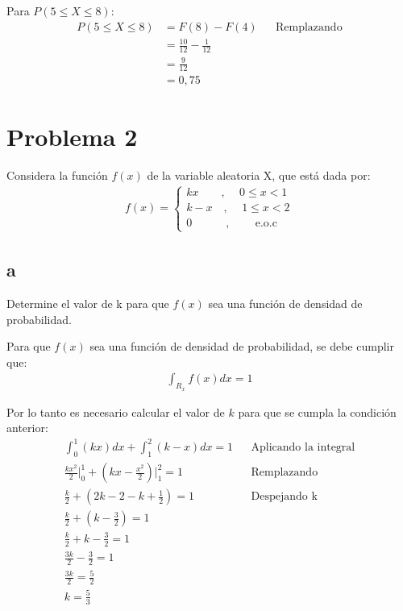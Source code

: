 \documentclass{templateNote}
\begin{document}
Para $P(5 \leq X \leq 8)$:
\begin{align*}
    P(5 \leq X \leq 8) &= F(8) - F(4) && \text{Remplazando} \\
    &= \frac{10}{12} - \frac{1}{12} \\
    &= \frac{9}{12} \\
    &= 0,75
\end{align*}

\newpage
\section{Problema 2}
\indent
Considera la función $f(x)$ de la variable aleatoria X, que está dada por:
\begin{align*}
    f(x) = \begin{cases}
        kx \quad \quad \text{, } \quad 0 \leq x < 1 \\
        k - x \quad \text{, }\quad 1 \leq x < 2 \\
        0 \quad \quad \quad \text{, } \quad \quad \text{e.o.c}
    \end{cases}
\end{align*}

\subsection{a}
Determine el valor de k para que $f(x)$ sea una función de densidad de probabilidad.

Para que $f(x)$ sea una función de densidad de probabilidad, se debe cumplir que:
\begin{align*}
    \int_{R_x}{f(x)dx} = 1
\end{align*}

Por lo tanto es necesario calcular el valor de $k$ para que se cumpla la condición anterior:
\begin{align*}
    \int_{0}^{1}{(kx)dx} + \int_{1}^{2}{(k-x)dx} = 1 && \text{Aplicando la integral} \\
    \frac{kx^2}{2} \Big|_{0}^{1} + (kx - \frac{x^2}{2}) \Big|_{1}^{2} = 1 && \text{Remplazando} \\
    \frac{k}{2} + (2k - 2 - k + \frac{1}{2}) = 1 && \text{Despejando k}\\
    \frac{k}{2} + (k - \frac{3}{2}) = 1 \\
    \frac{k}{2} + k - \frac{3}{2} = 1 \\
    \frac{3k}{2} - \frac{3}{2} = 1 \\
    \frac{3k}{2} = \frac{5}{2} \\
    k = \frac{5}{3}
\end{align*}
\end{document}
